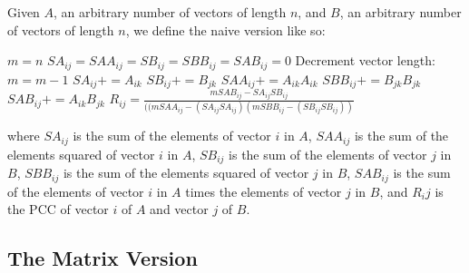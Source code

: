 \documentclass{bioinfo}
\begin{document}
Given $A$, an arbitrary number of vectors of length $n$, and $B$, an arbitrary number of vectors of length $n$, 
we define the naive version like so:

\vspace{2mm}

\begin{algorithmic}[1]
    \STATE $m=n$
    \STATE $SA_{ij}=SAA_{ij}=SB_{ij}=SBB_{ij}=SAB_{ij}=0$
        \STATE Decrement vector length: $m=m-1$
      \ELSE
        \STATE $SA_{ij}+=A_{ik}$
        \STATE $SB_{ij}+=B_{jk}$
        \STATE $SAA_{ij}+=A_{ik}A_{ik}$
        \STATE $SBB_{ij}+=B_{jk}B_{jk}$
        \STATE $SAB_{ij}+=A_{ik}B_{jk}$
      \ENDIF
    \ENDFOR 
    \STATE $R_{ij}=\frac{mSAB_{ij}-SA_{ij}SB_{ij}}{((mSAA_{ij}-(SA_{ij}SA_{ij})(mSBB_{ij}-(SB_{ij}SB_{ij}))}$
  \ENDFOR
\ENDFOR
\end{algorithmic}

\vspace{2mm}

\noindent where $SA_{ij}$ is the sum of the elements of vector $i$ in $A$, 
$SAA_{ij}$ is the sum of the elements squared of vector $i$ in $A$, 
$SB_{ij}$ is the sum of the elements of vector $j$ in $B$, 
$SBB_{ij}$ is the sum of the elements squared of vector $j$ in $B$, 
$SAB_{ij}$ is the sum of the elements of vector $i$ in $A$ times the  elements of vector $j$ in $B$, 
and $R_ij$ is the PCC of vector $i$ of $A$ and vector $j$ of $B$.

\subsection{The Matrix Version}
  
\vspace{2mm}
\end{document}
